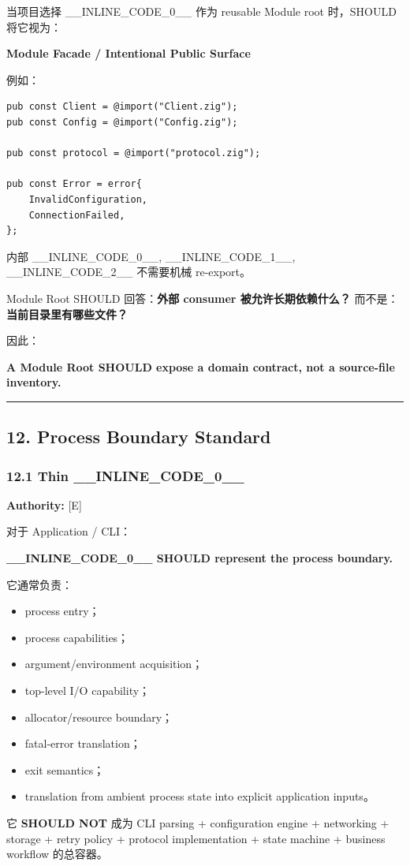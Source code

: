 \documentclass[11pt,a4paper]{article}
\begin{document}
当项目选择 \_\_INLINE\_CODE\_0\_\_ 作为 reusable Module root 时，SHOULD 将它视为：

\begin{gfmBlockquote}
\textbf{Module Facade / Intentional Public Surface}
\end{gfmBlockquote}
例如：

\begin{lstlisting}[language=zig]
pub const Client = @import("Client.zig");
pub const Config = @import("Config.zig");

pub const protocol = @import("protocol.zig");

pub const Error = error{
    InvalidConfiguration,
    ConnectionFailed,
};
\end{lstlisting}
内部 \_\_INLINE\_CODE\_0\_\_, \_\_INLINE\_CODE\_1\_\_, \_\_INLINE\_CODE\_2\_\_ 不需要机械 re-export。

Module Root SHOULD 回答：\textbf{外部 consumer 被允许长期依赖什么？} 而不是：\textbf{当前目录里有哪些文件？}

因此：

\begin{gfmBlockquote}
\textbf{A Module Root SHOULD expose a domain contract, not a source-file inventory.}
\end{gfmBlockquote}
\vspace{0.5em}\hrule\vspace{0.5em}
\subsection{12. Process Boundary Standard}
\subsubsection{12.1 Thin \_\_INLINE\_CODE\_0\_\_}
\textbf{Authority:} [E]

对于 Application / CLI：

\begin{gfmBlockquote}
\textbf{\_\_INLINE\_CODE\_0\_\_ SHOULD represent the process boundary.}
\end{gfmBlockquote}
它通常负责：

\begin{itemize}
  \item process entry；
  \item process capabilities；
  \item argument/environment acquisition；
  \item top-level I/O capability；
  \item allocator/resource boundary；
  \item fatal-error translation；
  \item exit semantics；
  \item translation from ambient process state into explicit application inputs。
\end{itemize}
它 \textbf{SHOULD NOT} 成为 CLI parsing + configuration engine + networking + storage + retry policy + protocol implementation + state machine + business workflow 的总容器。
\end{document}
